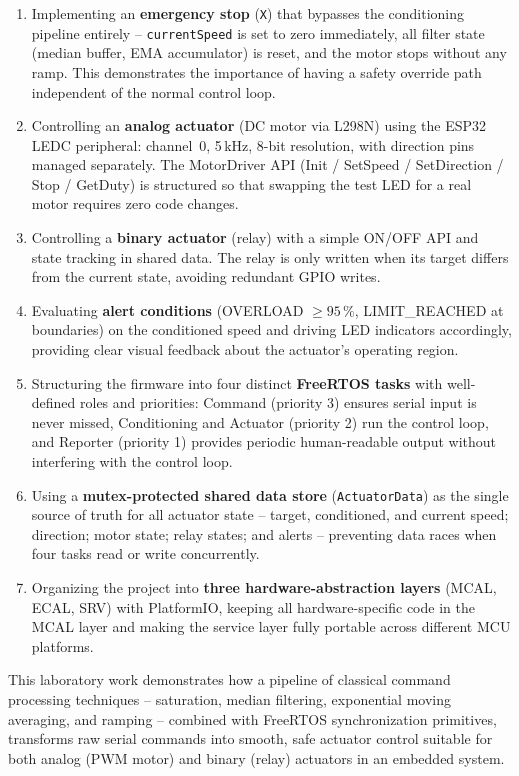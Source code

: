 \begin{enumerate}
\begin{itemize}
        RUNNING / RAMP\_DOWN) makes the ramp phase clearly visible on the OLED and
        in the serial plotter.
    \end{itemize}
  \item Implementing an \textbf{emergency stop} (\texttt{X}) that bypasses the
    conditioning pipeline entirely -- \texttt{currentSpeed} is set to zero immediately,
    all filter state (median buffer, EMA accumulator) is reset, and the motor stops
    without any ramp. This demonstrates the importance of having a safety override
    path independent of the normal control loop.
  \item Controlling an \textbf{analog actuator} (DC motor via L298N) using the ESP32
    LEDC peripheral: channel~0, 5\,kHz, 8-bit resolution, with direction pins managed
    separately. The MotorDriver API (Init / SetSpeed / SetDirection / Stop / GetDuty)
    is structured so that swapping the test LED for a real motor requires zero code
    changes.
  \item Controlling a \textbf{binary actuator} (relay) with a simple ON/OFF API and
    state tracking in shared data. The relay is only written when its target differs
    from the current state, avoiding redundant GPIO writes.
  \item Evaluating \textbf{alert conditions} (OVERLOAD $\geq 95\,\%$,
    LIMIT\_REACHED at boundaries) on the conditioned speed and driving LED indicators
    accordingly, providing clear visual feedback about the actuator's operating region.
  \item Structuring the firmware into four distinct \textbf{FreeRTOS tasks} with
    well-defined roles and priorities: Command (priority 3) ensures serial input is
    never missed, Conditioning and Actuator (priority 2) run the control loop, and
    Reporter (priority 1) provides periodic human-readable output without interfering
    with the control loop.
  \item Using a \textbf{mutex-protected shared data store} (\texttt{ActuatorData}) as
    the single source of truth for all actuator state -- target, conditioned, and
    current speed; direction; motor state; relay states; and alerts -- preventing
    data races when four tasks read or write concurrently.
  \item Organizing the project into \textbf{three hardware-abstraction layers} (MCAL,
    ECAL, SRV) with PlatformIO, keeping all hardware-specific code in the MCAL layer
    and making the service layer fully portable across different MCU platforms.
\end{enumerate}

This laboratory work demonstrates how a pipeline of classical command processing
techniques -- saturation, median filtering, exponential moving averaging, and ramping --
combined with FreeRTOS synchronization primitives, transforms raw serial commands into
smooth, safe actuator control suitable for both analog (PWM motor) and binary (relay)
actuators in an embedded system.
